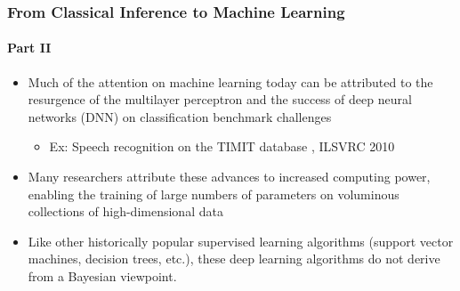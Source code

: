 \documentclass[aspectratio=169,usenames,dvipsnames]{beamer}
\begin{document}
\begin{frame}
\frametitle{From Classical Inference to Machine Learning}
\framesubtitle{Part II}

\begin{itemize}
\item Much of the attention on machine learning today can be attributed to the resurgence of the multilayer perceptron and the success of deep neural networks (DNN) on classification benchmark challenges 
\vspace{0.25em}
	\begin{itemize}
	\item Ex: Speech recognition on the TIMIT database \cite{mohamed}, ILSVRC 2010 \cite{krizhevsky}
	\end{itemize}
\vspace{0.5em}
\item Many researchers attribute these advances to increased \alert{computing power}, enabling the training of large numbers of parameters on voluminous collections of high-dimensional data
\vspace{0.5em}
\item Like other historically popular supervised learning algorithms (support vector machines, decision trees, etc.), these deep learning algorithms \alert{do not} derive from a Bayesian viewpoint. 

\end{itemize}

\end{frame}
 
\end{document}
